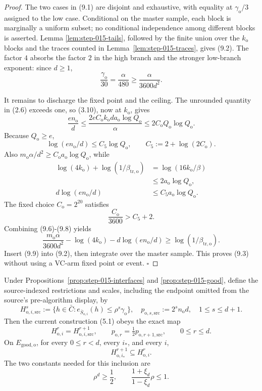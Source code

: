 \begin{proof}
The two cases in (9.1) are disjoint and exhaustive, with equality at
\(\gamma_{\mathrm o}/3\) assigned to the low case. Conditional on the
master sample, each block is marginally a uniform subset; no conditional
independence among different blocks is asserted. Lemma
\ref{lem:step-015-tails}, followed by the finite union over the
\(k_{\mathrm o}\) blocks and the traces counted in
Lemma~\ref{lem:step-015-traces}, gives (9.2). The factor \(4\) absorbs the
factor \(2\) in the high branch and the stronger low-branch exponent:
since \(d\ge1\),
\[
\frac{\gamma_{\mathrm o}}{30}
=\frac{\alpha}{480}
\ge\frac{\alpha}{3600d^2}.
\tag{9.4}
\]

It remains to discharge the fixed point and the ceiling. The unrounded
quantity in (2.6) exceeds one, so (3.10), now at \(k_{\mathrm o}\), gives
\[
\frac{en_{\mathrm o}}d
\le\frac{2eC_{\mathrm o}k_{\mathrm o}d
a_{\mathrm o}\log Q_{\mathrm o}}{\alpha}
\le2C_{\mathrm o}Q_{\mathrm o}\log Q_{\mathrm o}.
\tag{9.5}
\]
Because \(Q_{\mathrm o}\ge e\),
\[
\log(en_{\mathrm o}/d)
\le C_5\log Q_{\mathrm o},\qquad
C_5:=2+\log(2C_{\mathrm o}).
\tag{9.6}
\]
Also \(m_{\mathrm o}\alpha/d^2
\ge C_{\mathrm o}a_{\mathrm o}\log Q_{\mathrm o}\), while
\[
\begin{aligned}
\log(4k_{\mathrm o})+\log(1/\beta_{\mathrm{tr,o}})
&=\log(16k_{\mathrm o}/\beta)\\
&\le2a_{\mathrm o}\log Q_{\mathrm o},\\
d\log(en_{\mathrm o}/d)
&\le C_5a_{\mathrm o}\log Q_{\mathrm o}.
\end{aligned}
\tag{9.7}
\]
The fixed choice \(C_{\mathrm o}=2^{20}\) satisfies
\[
\frac{C_{\mathrm o}}{3600}>C_5+2.
\tag{9.8}
\]
Combining (9.6)-(9.8) yields
\[
\frac{m_{\mathrm o}\alpha}{3600d^2}
-\log(4k_{\mathrm o})-d\log(en_{\mathrm o}/d)
\ge\log(1/\beta_{\mathrm{tr,o}}).
\tag{9.9}
\]
Insert (9.9) into (9.2), then integrate over the master sample. This proves
(9.3) without using a VC-arm fixed point or event. \(\square\)


\end{proof}

\begin{lemma}\label{lem:step-015-source-map}
Under Propositions~\ref{prop:step-015-interfaces} and
\ref{prop:step-015-good}, define the source-indexed
restrictions and scales, including the endpoint omitted from the source's
pre-algorithm display, by
\[
H_{\mathrm o,i,\mathrm{src}}^s
:=\{h\in\bar C:
e_{\bar S_{\mathrm o,i}}(h)\le\rho^s\gamma_{\mathrm o}\},
\quad
p_{\mathrm o,s,\mathrm{src}}:=2^sn_{\mathrm o}d,
\quad 1\le s\le d+1.
\tag{10.1}
\]
Then the current construction (5.1) obeys the exact map
\[
H_{\mathrm o,i}^r=H_{\mathrm o,i,\mathrm{src}}^{r+1},
\qquad
p_{\mathrm o,r}=\tfrac12p_{\mathrm o,r+1,\mathrm{src}},
\qquad 0\le r\le d.
\tag{10.2}
\]
On \(E_{\mathrm{good,o}}\), for every \(0\le r<d\), every \(i_*\), and
every \(i\),
\[
H_{\mathrm o,i_*}^{r+1}\subseteq H_{\mathrm o,i}^r.
\tag{10.3}
\]
The two constants needed for this inclusion are
\[
\rho^d\ge\frac12,\qquad
\frac{1+\xi_d}{1-\xi_d}\rho\le1.
\tag{10.4}
\]


\end{lemma}

